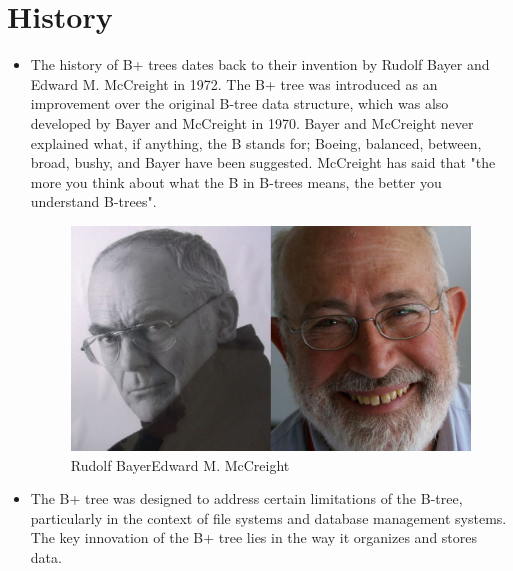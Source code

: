 \documentclass{article}
\begin{document}
    \section{History}
    \begin{itemize}
        \item The history of B+ trees dates back to their invention by Rudolf Bayer and Edward M. McCreight in 1972. The B+ tree was introduced as an improvement over the original B-tree data structure, which was also developed by Bayer and McCreight in 1970. Bayer and McCreight never explained what, if anything, the B stands for; Boeing, balanced, between, broad, bushy, and Bayer have been suggested. McCreight has said that "the more you think about what the B in B-trees means, the better you understand B-trees".
        \begin{figure}[ht]
            \centering
            \includegraphics[scale=0.2]{Images/image.png}\\
            \hspace{20pt}Rudolf Bayer\hspace{60pt}Edward M. McCreight \end{figure}
        \item The B+ tree was designed to address certain limitations of the B-tree, particularly in the context of file systems and database management systems. The key innovation of the B+ tree lies in the way it organizes and stores data.
    \end{itemize}
\end{document}
